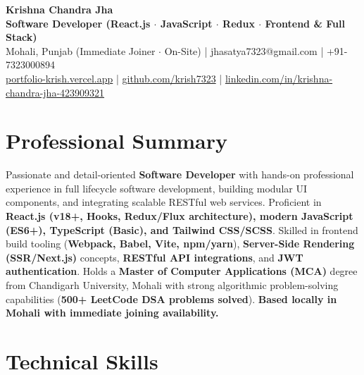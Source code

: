 \documentclass[a4paper,10pt]{article}
\begin{document}
\begin{center}

    {\LARGE \textbf{Krishna Chandra Jha}} \\[2.5pt]

    \textbf{Software Developer (React.js $\cdot$ JavaScript $\cdot$ Redux $\cdot$ Frontend \& Full Stack)} \\[3.5pt]

    Mohali, Punjab (Immediate Joiner $\cdot$ On-Site)
    \quad | \quad
    jhasatya7323@gmail.com
    \quad | \quad
    +91-7323000894
    \\[2.5pt]

    \href{https://portfolio-ashen-alpha-dv0whhsamo.vercel.app/}{portfolio-krish.vercel.app}
    \quad | \quad
    \href{https://github.com/krish7323}{github.com/krish7323}
    \quad | \quad
    \href{https://linkedin.com/in/krishna-chandra-jha-423909321}
    {linkedin.com/in/krishna-chandra-jha-423909321}

\end{center}

\section*{Professional Summary}

Passionate and detail-oriented \textbf{Software Developer} with hands-on professional experience in full lifecycle software development, building modular UI components, and integrating scalable RESTful web services. Proficient in \textbf{React.js (v18+, Hooks, Redux/Flux architecture), modern JavaScript (ES6+), TypeScript (Basic), and Tailwind CSS/SCSS}. Skilled in frontend build tooling (\textbf{Webpack, Babel, Vite, npm/yarn}), \textbf{Server-Side Rendering (SSR/Next.js)} concepts, \textbf{RESTful API integrations}, and \textbf{JWT authentication}. Holds a \textbf{Master of Computer Applications (MCA)} degree from Chandigarh University, Mohali with strong algorithmic problem-solving capabilities (\textbf{500+ LeetCode DSA problems solved}). \textbf{Based locally in Mohali with immediate joining availability.}

\section*{Technical Skills}
\end{document}
